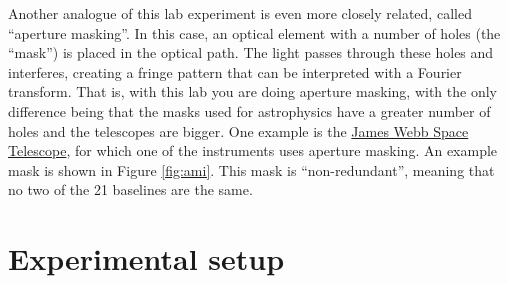 \documentclass[11pt]{article}
\begin{document}
Another analogue of this lab experiment is even more closely related, called ``aperture masking''. In this case, an optical element with a number of holes (the ``mask'') is placed in the optical path. The light passes through these holes and interferes, creating a fringe pattern that can be interpreted with a Fourier transform. That is, with this lab you are doing aperture masking, with the only difference being that the masks used for astrophysics have a greater number of holes and the telescopes are bigger. One example is the \href{https://jwst-docs.stsci.edu/jwst-near-infrared-imager-and-slitless-spectrograph/niriss-observing-modes/niriss-aperture-masking-interferometry}{James Webb Space Telescope}, for which one of the instruments uses aperture masking. An example mask is shown in Figure \ref{fig:ami}. This mask is ``non-redundant'', meaning that no two of the 21 baselines are the same.

\clearpage
\section{Experimental setup}\label{sec:exp_setup}
\end{document}
